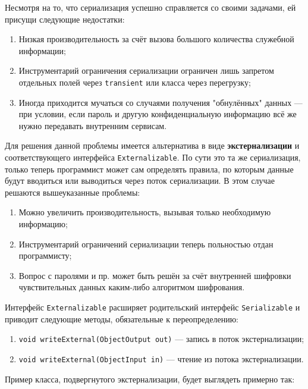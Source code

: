 Несмотря на то, что сериализация успешно справляется со своими задачами, ей присущи следующие недостатки:

\begin{enumerate}
    \item Низкая производительность за счёт вызова большого количества служебной информации;
    \item Инструментарий ограничения сериализации ограничен лишь запретом отдельных полей через \verb|transient| или класса через перегрузку;
    \item Иногда приходится мучаться со случаями получения "обнулённых" данных — при условии, если пароль и другую конфиденциальную информацию всё же нужно передавать внутренним сервисам.
\end{enumerate}

Для решения данной проблемы имеется альтернатива в виде \textbf{экстернализации} и соответствующего интерфейса \verb|Externalizable|. По сути это та же сериализация, только теперь программист может сам определять правила, по которым данные будут вводиться или выводиться через поток сериализации. В этом случае решаются вышеуказанные проблемы:

\begin{enumerate}
    \item Можно увеличить производительность, вызывая только необходимую информацию;
    \item Инструментарий ограничений сериализации теперь польностью отдан программисту;
    \item Вопрос с паролями и пр. может быть решён за счёт внутренней шифровки чувствительных данных каким-либо алгоритмом шифрования.
\end{enumerate}

Интерфейс \verb|Externalizable| расширяет родительский интерфейс \verb|Serializable| и приводит следующие методы, обязательные к переопределению:

\begin{enumerate}
    \item \verb|void writeExternal(ObjectOutput out)| — запись в поток экстернализации;
    \item \verb|void writeExternal(ObjectInput in)| — чтение из потока экстернализации.
\end{enumerate}

Пример класса, подвергнутого экстернализации, будет выглядеть примерно так:

